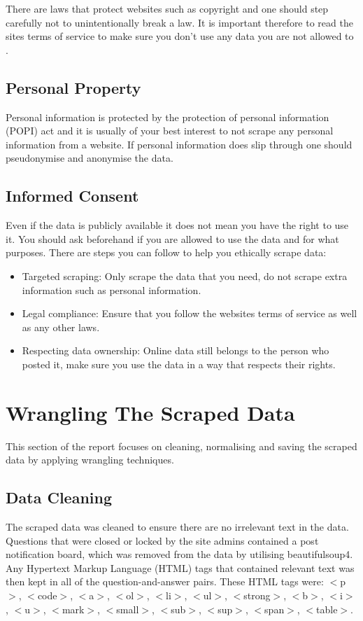\documentclass[10pt]{article}
\begin{document}
There are laws that protect websites such as copyright and one should step carefully not to unintentionally
break a law. It is important therefore to read the sites terms of service to make
sure you don't use any data you are not allowed to \cite{stackexchange-terms}.

\subsection{Personal Property}
Personal information is protected by the protection of personal information (POPI) act and it is usually of
your best interest to not scrape any personal information from a website. If personal information does slip
through one should pseudonymise and anonymise the data. 

\subsection{Informed Consent}

Even if the data is publicly available it does not mean you have the right to use it. You should ask
beforehand if you are allowed to use the data and for what purposes.
There are steps you can follow to help you ethically scrape data:
\begin{itemize}
    \item Targeted scraping: Only scrape the data that you need, do not scrape extra information such as personal information.
    \item Legal compliance: Ensure that you follow the websites terms of service as well as any other laws.
    \item Respecting data ownership: Online data still belongs to the person who posted it, make sure you use the data in a way that respects their rights.
\end{itemize}

\section{Wrangling The Scraped Data}

This section of the report focuses on cleaning, normalising and saving the scraped data
by applying wrangling techniques.

\subsection{Data Cleaning}

The scraped data was cleaned to ensure there are no irrelevant text in the data. Questions that
were closed or locked by the site admins contained a post notification board, which was removed
from the data by utilising beautifulsoup4. Any Hypertext Markup Language (HTML) tags that contained relevant text was then kept
in all of the question-and-answer pairs. These HTML tags were: $<$p$>$, $<$code$>$, $<$a$>$, $<$ol$>$, $<$li$>$, $<$ul$>$,
$<$strong$>$, $<$b$>$, $<$i$>$, $<$u$>$, $<$mark$>$, $<$small$>$, $<$sub$>$, $<$sup$>$, $<$span$>$, $<$table$>$.
\end{document}
